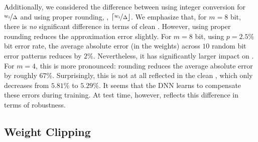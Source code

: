 Additionally, we considered the difference between using integer conversion for $\nicefrac{w_i}{\Delta}$ and using proper rounding, \ie, $\lceil\nicefrac{w_i}{\Delta}\rfloor$. We emphasize that, for $m = 8$ bit, there is \emph{no} significant difference in terms of clean \TE. However, using proper rounding reduces the approximation error slightly. For $m = 8$ bit, using $p = 2.5\%$ bit error rate, the average absolute error (in the weights) across $10$ random bit error patterns reduces by $2\%$. Nevertheless, it has significantly larger impact on \RTE. For $m = 4$, this is more pronounced: rounding reduces the average absolute error by roughly $67\%$. Surprisingly, this is not at all reflected in the clean \TE, which only decreases from $5.81\%$ to $5.29\%$. It seems that the DNN learns to compensate these errors during training. At test time, however, \RTE reflects this difference in terms of robustness.


\subsection{Weight Clipping}
\label{subsec:supp-experiments-clipping}

